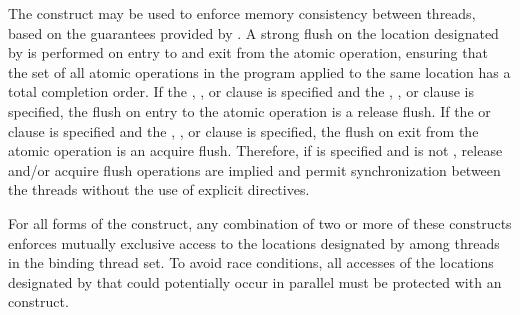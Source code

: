 The  construct may be used to enforce memory consistency between
threads, based on the guarantees provided by .  A strong flush on the location designated by 
is performed on entry to and exit from the atomic operation, ensuring that the
set of all atomic operations in the program applied to the same location has a
total completion order.  If the , , or 
clause is specified and the , , or
 clause is specified, the flush on entry to the atomic operation is a
release flush.  If the  or  clause
is specified and the , , or 
clause is specified, the flush on exit from the atomic operation is an acquire flush.
Therefore, if  is specified and is not
, release and/or acquire flush operations are implied and permit
synchronization between the threads without the use of explicit 
directives.

%

For all forms of the  construct, any combination of two or more
of these  constructs enforces mutually exclusive access to the
locations designated by  among threads in the binding thread set.  To
avoid race conditions, all accesses of the locations designated by 
that could potentially occur in parallel must be protected with an
 construct.

